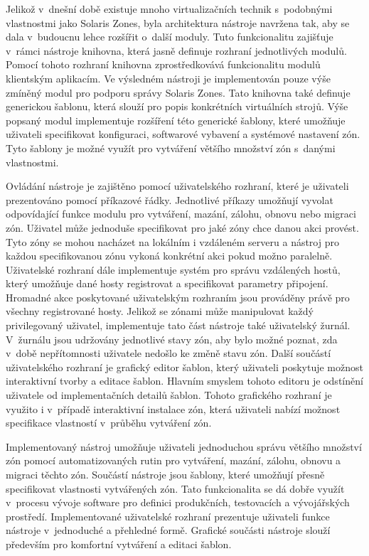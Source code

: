 Jelikož v~dnešní době existuje mnoho virtualizačních technik s~podobnými vlastnostmi jako Solaris Zones, byla architektura nástroje
navržena tak, aby se dala v~budoucnu lehce rozšířit o~další moduly. Tuto funkcionalitu zajišťuje v~rámci nástroje knihovna, která
jasně definuje rozhraní jednotlivých modulů. Pomocí tohoto rozhraní knihovna zprostředkovává funkcionalitu modulů klientským 
aplikacím. Ve výsledném nástroji je implementován pouze výše zmíněný modul pro podporu správy Solaris Zones. Tato knihovna také
definuje generickou šablonu, která slouží pro popis konkrétních virtuálních strojů. Výše popsaný modul implementuje rozšíření této
generické šablony, které umožňuje uživateli specifikovat konfiguraci, softwarové vybavení a systémové nastavení zón. Tyto šablony
je možné využít pro vytváření většího množství zón s~danými vlastnostmi.

Ovládání nástroje je zajištěno pomocí uživatelského rozhraní, které je uživateli prezentováno pomocí příkazové řádky. Jednotlivé
příkazy umožňují vyvolat odpovídající funkce modulu pro vytváření, mazání, zálohu, obnovu nebo migraci zón. Uživatel může jednoduše 
specifikovat pro jaké zóny chce danou akci provést. Tyto zóny se mohou nacházet na lokálním i vzdáleném serveru a nástroj
pro každou specifikovanou zónu vykoná konkrétní akci pokud možno paralelně. Uživatelské rozhraní dále implementuje 
systém pro správu vzdálených hostů, který umožňuje dané hosty registrovat a specifikovat parametry připojení. Hromadné akce
poskytované uživatelským rozhraním jsou prováděny právě pro všechny registrované hosty. Jelikož se zónami může manipulovat každý
privilegovaný uživatel, implementuje tato část nástroje také uživatelský žurnál. V~žurnálu jsou udržovány jednotlivé stavy zón, aby
bylo možné poznat, zda v~době nepřítomnosti uživatele nedošlo ke změně stavu zón. Další součástí uživatelského rozhraní je
grafický editor šablon, který uživateli poskytuje možnost interaktivní tvorby a editace šablon. Hlavním smyslem tohoto editoru
je odstínění uživatele od implementačních detailů šablon. Tohoto grafického rozhraní je využito i v~případě interaktivní instalace
zón, která uživateli nabízí možnost specifikace vlastností v~průběhu vytváření zón. 

Implementovaný nástroj umožňuje uživateli jednoduchou správu většího množství zón pomocí automatizovaných rutin pro vytváření,
mazání, zálohu, obnovu a migraci těchto zón. Součástí nástroje jsou šablony, které umožňují přesně specifikovat vlastnosti 
vytvářených zón. Tato funkcionalita se dá dobře využít v~procesu vývoje software pro definici produkčních, testovacích a 
vývojářských prostředí. Implementované uživatelské rozhraní prezentuje uživateli funkce nástroje v~jednoduché a přehledné formě.
Grafické součásti nástroje slouží především pro komfortní vytváření a editaci šablon.

